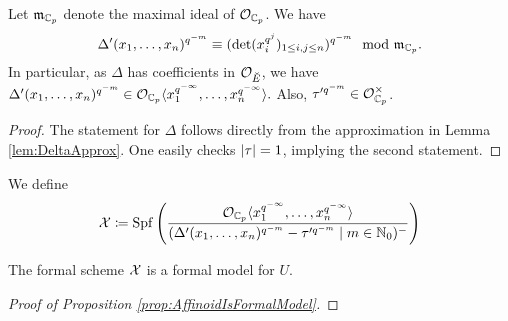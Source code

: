 \documentclass[../main.tex]{subfiles}
\begin{document}
\begin{lem}\label{lem:PropsOfDeltaPrAndTauPr}
  Let $\mathfrak{m}_{\mathbb{C}_p}$ denote the maximal ideal of $\mathcal{O}_{\mathbb{C}_p}$. We have
  \begin{equation*}
    \Delta'(x_1, \dots, x_n)^{q^{-m}} \equiv (\det(x_i^{q^j})_{1 \leq i,j \leq
    n})^{q^{-m}} \mod {\mathfrak{m}}_{\mathbb{C}_p}.
  \end{equation*}
  In particular, as $\Delta$ has coefficients in $\mathcal{O}_{\breve {E}}$, we have 
  $\Delta'(x_1, \dots, x_n)^{q^{-m}} \in \mathcal{O}_{\mathbb{C}_p} \langle x_1^{q^{-\infty}}, \dots
  , x_n^{q^{-\infty}}\rangle.$
  Also, $\tau'^{q^{-m}} \in \mathcal{O}_{\mathbb{C}_p}^\times$. 
\begin{proof}
  The statement for $\Delta$ follows directly from the approximation in Lemma
  \ref{lem:DeltaApprox}. One easily checks $\lvert \tau \rvert = 1$, implying the second
  statement.
\end{proof}
\end{lem}

We define 
\begin{equation*}
  \mathcal{X} \coloneq \operatorname{Spf} \left(
    \frac
    {\mathcal{O}_{\mathbb{C}_p} \langle x_1^{q^{-\infty}}, \dots , x_n^{q^{-\infty}}
      \rangle}
    {(\Delta'(x_1, \dots, x_n)^{q^{-m}} - \tau'^{q^{-m}} \mid m \in \mathbb{N}_0)^-
      }\right)
\end{equation*}

\begin{prop}\label{prop:AffinoidIsFormalModel}
  The formal scheme $\mathcal{X}$ is a formal model for $U$. 
\end{prop}
\begin{proof}[Proof of Proposition \ref{prop:AffinoidIsFormalModel}] 
\end{proof}

\end{document}
